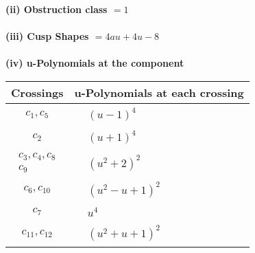 \documentclass[1p]{elsarticle_modified}
\theoremstyle{definition}
\begin{document}
\flushleft \textbf{(ii) Obstruction class $= 1$}\\~\\
\flushleft \textbf{(iii) Cusp Shapes $= 4 a u+4 u-8$}\\~\\
\newpage\renewcommand{\arraystretch}{1}
\flushleft \textbf{(iv) u-Polynomials at the component}\newline \\
\begin{tabular}{m{50pt}|m{274pt}}
Crossings & \hspace{64pt}u-Polynomials at each crossing \\
\hline $$\begin{aligned}c_{1},c_{5}\end{aligned}$$&$\begin{aligned}
&(u-1)^4
\end{aligned}$\\
\hline $$\begin{aligned}c_{2}\end{aligned}$$&$\begin{aligned}
&(u+1)^4
\end{aligned}$\\
\hline $$\begin{aligned}c_{3},c_{4},c_{8}\\c_{9}\end{aligned}$$&$\begin{aligned}
&(u^2+2)^2
\end{aligned}$\\
\hline $$\begin{aligned}c_{6},c_{10}\end{aligned}$$&$\begin{aligned}
&(u^2- u+1)^2
\end{aligned}$\\
\hline $$\begin{aligned}c_{7}\end{aligned}$$&$\begin{aligned}
&u^4
\end{aligned}$\\
\hline $$\begin{aligned}c_{11},c_{12}\end{aligned}$$&$\begin{aligned}
&(u^2+u+1)^2
\end{aligned}$\\
\hline
\end{tabular}\\~\\
\end{document}
